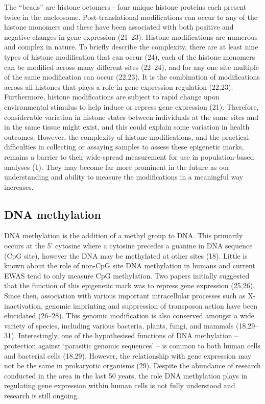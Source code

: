 \documentclass[11pt,oneside]{bristolthesis}
\begin{document}
The ``beads'' are histone octomers - four unique histone proteins each present twice in the nucleosome. Post-translational modifications can occur to any of the histone monomers and these have been associated with both positive and negative changes in gene expression (21--23). Histone modifications are numerous and complex in nature. To briefly describe the complexity, there are at least nine types of histone modification that can occur (24), each of the histone monomers can be modified across many different sites (22--24), and for any one site multiple of the same modification can occur (22,23). It is the combination of modifications across all histones that plays a role in gene expression regulation (22,23). Furthermore, histone modifications are subject to rapid change upon environmental stimulus to help induce or repress gene expression (21). Therefore, considerable variation in histone states between individuals at the same sites and in the same tissue might exist, and this could explain some variation in health outcomes. However, the complexity of histone modifications, and the practical difficulties in collecting or assaying samples to assess these epigenetic marks, remains a barrier to their wide-spread measurement for use in population-based analyses (1). They may become far more prominent in the future as our understanding and ability to measure the modifications in a meaningful way increases.

\hypertarget{dna-methylation}{%
\subsection{DNA methylation}\label{dna-methylation}}

DNA methylation is the addition of a methyl group to DNA. This primarily occurs at the 5' cytosine where a cytosine precedes a guanine in DNA sequence (CpG site), however the DNA may be methylated at other sites (18). Little is known about the role of non-CpG site DNA methylation in humans and current EWAS tend to only measure CpG methylation. Two papers initially suggested that the function of this epigenetic mark was to repress gene expression (25,26). Since then, association with various important intracellular processes such as X-inactivation, genomic imprinting and suppression of transposon action have been elucidated (26--28). This genomic modification is also conserved amongst a wide variety of species, including various bacteria, plants, fungi, and mammals (18,29--31). Interestingly, one of the hypothesised functions of DNA methylation -- protection against `parasitic genomic sequences' -- is common to both human cells and bacterial cells (18,29). However, the relationship with gene expression may not be the same in prokaryotic organisms (29). Despite the abundance of research conducted in the area in the last 50 years, the role DNA methylation plays in regulating gene expression within human cells is not fully understood and research is still ongoing.
\end{document}
